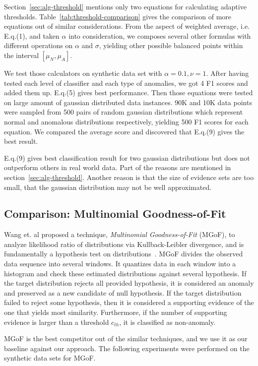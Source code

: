 \documentclass[10pt,conference,letterpaper]{IEEEtran}
\begin{document}
			Section~\ref{sec:alg-threshold} mentions only two equations for calculating adaptive thresholds. Table~\ref{tab:threshold-comparison} gives the comparison of more equations out of similar considerations. From the aspect of weighted average, i.e. E.q.(1), and taken $\alpha$ into consideration, we composes several other formulas with different operations on $\alpha$ and $\sigma$, yielding other possible balanced points within the interval $[\mu_N, \mu_A]$.
			
			We test those calculators on synthetic data set with $\alpha = 0.1, \nu = 1$. After having tested each level of classifier and each type of anomalies, we got 4 F1 scores and added them up. E.q.(5) gives best performance. Then those equations were tested on large amount of gaussian distributed data instances. 90K and 10K data points were sampled from 500 pairs of random gaussian distributions which represent normal and anomalous distributions respectively, yielding 500 F1 scores for each equation. We compared the average score and discovered that E.q.(9) gives the best result.
	
			E.q.(9) gives best classification result for two gaussian distributions but does not outperform others in real world data. Part of the reasons are mentioned in section~\ref{sec:alg-threshold}. Another reason is that the size of evidence sets are too small, that the gaussian distribution may not be well approximated.
	
		\subsection{Comparison: Multinomial Goodness-of-Fit}
			Wang et. al proposed a technique, \textit{Multinomial Goodness-of-Fit} (MGoF), to analyze likelihood ratio of distributions via Kullback-Leibler divergence, and is fundamentally a hypothesis test on distributions~\cite{wang2011statistical}. 
			MGoF divides the observed data sequence into several windows. It quantizes data in each window into a histogram and check these estimated distributions against several hypothesis. If the target distribution rejects all provided hypothesis, it is considered an anomaly and preserved as a new candidate of null hypothesis. If the target distribution failed to reject some hypothesis, then it is considered a supporting evidence of the one that yields most similarity. Furthermore, if the number of supporting evidence is larger than a threshold $c_{th}$, it is classified as non-anomaly.
			
			MGoF is the best competitor out of the similar techniques, and we use it as our baseline against our approach. The following experiments were performed on the synthetic data sets for MGoF.
			
\end{document}
